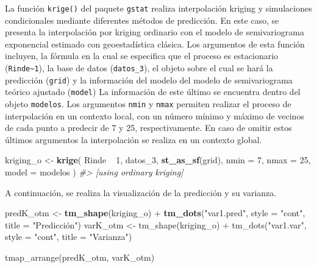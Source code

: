 \documentclass[11pt,b5paper,]{krantz}
\newenvironment{Shaded}{}{}
\newcommand{\CommentTok}[1]{\textcolor[rgb]{0.38,0.63,0.69}{\textit{#1}}}
\newcommand{\DataTypeTok}[1]{\textcolor[rgb]{0.56,0.13,0.00}{#1}}
\newcommand{\DecValTok}[1]{\textcolor[rgb]{0.25,0.63,0.44}{#1}}
\newcommand{\KeywordTok}[1]{\textcolor[rgb]{0.00,0.44,0.13}{\textbf{#1}}}
\newcommand{\NormalTok}[1]{#1}
\newcommand{\OperatorTok}[1]{\textcolor[rgb]{0.40,0.40,0.40}{#1}}
\newcommand{\StringTok}[1]{\textcolor[rgb]{0.25,0.44,0.63}{#1}}
\begin{document}
La función \texttt{krige()} del paquete \texttt{gstat} realiza interpolación kriging y simulaciones condicionales mediante diferentes métodos de predicción. En este caso, se presenta la interpolación por kriging ordinario con el modelo de semivariograma exponencial estimado con geoestadística clásica. Los argumentos de esta función incluyen, la fórmula en la cual se especifica que el proceso es estacionario (\texttt{Rinde\textasciitilde{}1}), la base de datos (\texttt{datos\_3}), el objeto sobre el cual se hará la predicción (\texttt{grid}) y la información del modelo del modelo de semivariograma teórico ajustado (\texttt{model}) La información de este último se encuentra dentro del objeto \texttt{modelos}. Los argumentos \texttt{nmin} y \texttt{nmax} permiten realizar el proceso de interpolación en un contexto local, con un número mínimo y máximo de vecinos de cada punto a predecir de 7 y 25, respectivamente. En caso de omitir estos últimos argumentos la interpolación se realiza en un contexto global.

\begin{Shaded}
\begin{Highlighting}[]
\NormalTok{kriging_o <-}
\StringTok{  }\KeywordTok{krige}\NormalTok{(}
\NormalTok{    Rinde }\OperatorTok{~}\StringTok{ }\DecValTok{1}\NormalTok{,}
\NormalTok{    datos_}\DecValTok{3}\NormalTok{,}
    \KeywordTok{st_as_sf}\NormalTok{(grid),}
    \DataTypeTok{nmin =} \DecValTok{7}\NormalTok{,}
    \DataTypeTok{nmax =} \DecValTok{25}\NormalTok{,}
    \DataTypeTok{model =}\NormalTok{ modelos}
\NormalTok{  ) }
\CommentTok{#> [using ordinary kriging]}
\end{Highlighting}
\end{Shaded}

A continuación, se realiza la visualización de la predicción y su varianza.

\begin{Shaded}
\begin{Highlighting}[]
\NormalTok{predK_otm <-}\StringTok{ }\KeywordTok{tm_shape}\NormalTok{(kriging_o) }\OperatorTok{+}
\StringTok{  }\KeywordTok{tm_dots}\NormalTok{(}\StringTok{"var1.pred"}\NormalTok{, }\DataTypeTok{style =} \StringTok{"cont"}\NormalTok{,}
          \DataTypeTok{title =} \StringTok{"Predicción")}
\StringTok{varK_otm <-  tm_shape(kriging_o) +}
\StringTok{  tm_dots("}\NormalTok{var1.var}\StringTok{", style = "}\NormalTok{cont}\StringTok{",}
\StringTok{          title = "}\NormalTok{Varianza}\StringTok{")}

\StringTok{tmap_arrange(predK_otm, varK_otm)}
\end{Highlighting}
\end{Shaded}
\end{document}
